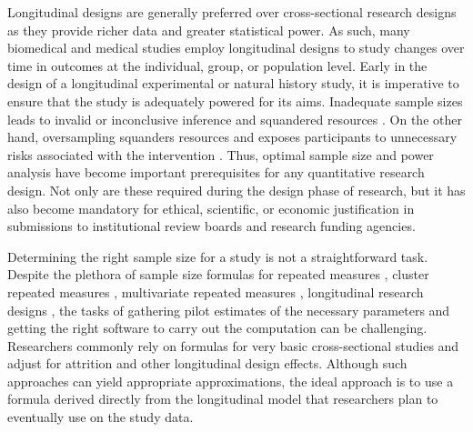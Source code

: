 Longitudinal designs are generally preferred over cross-sectional research designs as they provide richer data and greater statistical power. As such, many biomedical and medical studies employ longitudinal designs to study changes over time in outcomes at the individual, group, or population level. Early in the design of a longitudinal experimental or natural history study, it is imperative to ensure that the study is adequately powered for its aims.  Inadequate sample sizes leads to invalid or inconclusive inference and squandered resources \citep{Lu_Methrotra_Liu(2009),Yan_Su(2006)}. On the other hand, oversampling squanders resources and exposes participants to unnecessary risks associated with the intervention \citep{Lu_Methrotra_Liu(2009)}. Thus, optimal sample size and power analysis have become important prerequisites for any quantitative research design. Not only are these required during the design phase of research, but it has also become mandatory for ethical, scientific, or economic justification in submissions to institutional review boards and research funding agencies.

Determining the right sample size for a study is not a straightforward task. Despite the plethora of sample size formulas for repeated measures \citep{Overall_Doyle(1994),Lui(1992),Rochon(1991), Guo_etal(2013)}, cluster repeated measures \citep{Liu_Shih_Gehan(2002)}, multivariate repeated measures \citep{Vonesh_Schork(1986),Guo_Johnson(1996)}, longitudinal research designs \citep{Lefante(1990)}, the tasks of gathering pilot estimates of the necessary parameters and getting the right software to carry out the computation can be challenging. Researchers commonly rely on formulas for very basic cross-sectional studies and adjust for attrition and other longitudinal design effects. Although such approaches can yield appropriate approximations, the ideal approach is to use a formula derived directly from the longitudinal model that researchers plan to eventually use on the study data.

